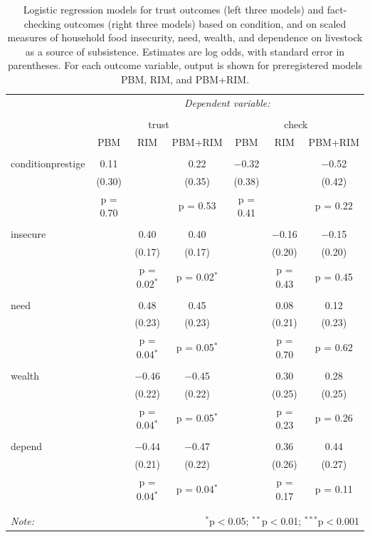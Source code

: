 \documentclass[
  11pt,
]{article}
\begin{document}
\begin{table}[!htbp] \centering 
  \caption{Logistic regression models for trust outcomes (left three models) and fact-checking outcomes (right three models) based on condition, and on scaled measures of household food insecurity, need, wealth, and dependence on livestock as a source of subsistence. Estimates are log odds, with standard error in parentheses. For each outcome variable, output is shown for preregistered models PBM, RIM, and PBM+RIM.} 
  \label{} 
\begin{tabular}{@{\extracolsep{5pt}}lcccccc} 
\\[-1.8ex] & \multicolumn{6}{c}{\textit{Dependent variable:}} \\ 
\cline{2-7} 
\\[-1.8ex] & \multicolumn{3}{c}{trust} & \multicolumn{3}{c}{check} \\ 
 & PBM & RIM & PBM+RIM & PBM & RIM & PBM+RIM \\ 
\hline \\[-1.8ex] 
 conditionprestige & 0.11 &  & 0.22 & $-$0.32 &  & $-$0.52 \\ 
  & (0.30) &  & (0.35) & (0.38) &  & (0.42) \\ 
  & p = 0.70 &  & p = 0.53 & p = 0.41 &  & p = 0.22 \\ 
  & & & & & & \\ 
 insecure &  & 0.40 & 0.40 &  & $-$0.16 & $-$0.15 \\ 
  &  & (0.17) & (0.17) &  & (0.20) & (0.20) \\ 
  &  & p = 0.02$^{*}$ & p = 0.02$^{*}$ &  & p = 0.43 & p = 0.45 \\ 
  & & & & & & \\ 
 need &  & 0.48 & 0.45 &  & 0.08 & 0.12 \\ 
  &  & (0.23) & (0.23) &  & (0.21) & (0.23) \\ 
  &  & p = 0.04$^{*}$ & p = 0.05$^{*}$ &  & p = 0.70 & p = 0.62 \\ 
  & & & & & & \\ 
 wealth &  & $-$0.46 & $-$0.45 &  & 0.30 & 0.28 \\ 
  &  & (0.22) & (0.22) &  & (0.25) & (0.25) \\ 
  &  & p = 0.04$^{*}$ & p = 0.05$^{*}$ &  & p = 0.23 & p = 0.26 \\ 
  & & & & & & \\ 
 depend &  & $-$0.44 & $-$0.47 &  & 0.36 & 0.44 \\ 
  &  & (0.21) & (0.22) &  & (0.26) & (0.27) \\ 
  &  & p = 0.04$^{*}$ & p = 0.04$^{*}$ &  & p = 0.17 & p = 0.11 \\ 
  & & & & & & \\ 
\hline \\[-1.8ex] 
\textit{Note:}  & \multicolumn{6}{r}{$^{*}$p$<$0.05; $^{**}$p$<$0.01; $^{***}$p$<$0.001} \\ 
\end{tabular} 
\end{table}
\end{document}
